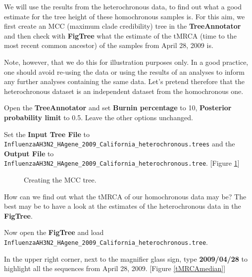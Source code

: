 \documentclass[11pt]{article}
\begin{document}
We will use the results from the heterochronous data, to find out what a good estimate for the tree height of these homochronous samples is. For this aim, we first create an MCC (maximum clade credibility) tree in the \textbf{TreeAnnotator} and then check with \textbf{FigTree} what the estimate of the tMRCA (time to the most recent common ancestor) of the samples from April 28, 2009 is.

Note, however, that we do this for illustration purposes only. In a good practice, one should avoid re-using the data or using the results of an analyses to inform any further analyses containing the same data. Let's pretend therefore that the heterochronous dataset is an independent dataset from the homochronous one. 

\begin{framed}
Open the \textbf{TreeAnnotator} and set \textbf{Burnin percentage} to 10, \textbf{Posterior probability limit} to 0.5. Leave the other options unchanged.

Set the \textbf{Input Tree File} to \texttt{InfluenzaAH3N2\_HAgene\_2009\_California\_heterochronous.trees} and the \textbf{Output File} to \texttt{InfluenzaAH3N2\_HAgene\_2009\_California\_heterochronous.tree}. [Figure \ref{treeAnnotator}]
\end{framed}

\begin{figure}[h!]
\centering
{}
\caption{\small Creating the MCC tree.}
\label{treeAnnotator}
\end{figure}

\newpage
How can we find out what the tMRCA of our homochronous data may be? The best may be to have a look at the estimates of the heterochronous data in the \textbf{FigTree}.

\begin{framed}
Now open the \textbf{FigTree} and load \texttt{InfluenzaAH3N2\_HAgene\_2009\_California\_heterochronous.tree}.

In the upper right corner, next to the magnifier glass sign, type \textbf{2009/04/28} to highlight all the sequences from April 28, 2009. [Figure \ref{tMRCAmedian}]
\end{framed}
\end{document}
